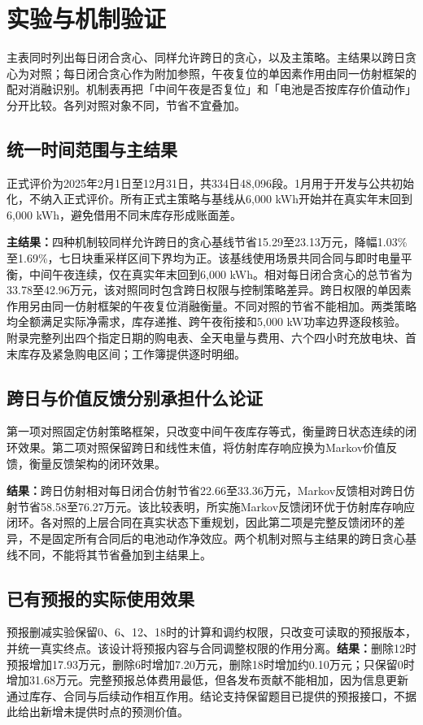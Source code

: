 \documentclass[UTF8,a4paper,zihao=-4,fontset=mac]{ctexart}
\begin{document}
\section{实验与机制验证}
主表同时列出每日闭合贪心、同样允许跨日的贪心，以及主策略。主结果以跨日贪心为对照；每日闭合贪心作为附加参照，午夜复位的单因素作用由同一仿射框架的配对消融识别。机制表再把「中间午夜是否复位」和「电池是否按库存价值动作」分开比较。各列对照对象不同，节省不宜叠加。

\subsection{统一时间范围与主结果}
正式评价为2025年2月1日至12月31日，共334日48,096段。1月用于开发与公共初始化，不纳入正式评价。所有正式主策略与基线从6,000 kWh开始并在真实年末回到6,000 kWh，避免借用不同末库存形成账面差。


\textbf{主结果：}四种机制较同样允许跨日的贪心基线节省15.29至23.13万元，降幅1.03\%至1.69\%，七日块重采样区间下界均为正。该基线使用场景共同合同与即时电量平衡，中间午夜连续，仅在真实年末回到6,000 kWh。相对每日闭合贪心的总节省为33.78至42.96万元，该对照同时包含跨日权限与控制策略差异。跨日权限的单因素作用另由同一仿射框架的午夜复位消融衡量。不同对照的节省不能相加。两类策略均全额满足实际净需求，库存递推、跨午夜衔接和5,000 kW功率边界逐段核验。附录完整列出四个指定日期的购电表、全天电量与费用、六个四小时充放电块、首末库存及紧急购电区间；工作簿提供逐时明细。

\subsection{跨日与价值反馈分别承担什么论证}
第一项对照固定仿射策略框架，只改变中间午夜库存等式，衡量跨日状态连续的闭环效果。第二项对照保留跨日和线性末值，将仿射库存响应换为Markov价值反馈，衡量反馈架构的闭环效果。

\textbf{结果：}跨日仿射相对每日闭合仿射节省22.66至33.36万元，Markov反馈相对跨日仿射节省58.58至76.27万元。该比较表明，所实施Markov反馈闭环优于仿射库存响应闭环。各对照的上层合同在真实状态下重规划，因此第二项是完整反馈闭环的差异，不是固定所有合同后的电池动作净效应。两个机制对照与主结果的跨日贪心基线不同，不能将其节省叠加到主结果上。

\subsection{已有预报的实际使用效果}

预报删减实验保留0、6、12、18时的计算和调约权限，只改变可读取的预报版本，并统一真实终点。该设计将预报内容与合同调整权限的作用分离。\textbf{结果：}删除12时预报增加17.93万元，删除6时增加7.20万元，删除18时增加约0.10万元；只保留0时增加31.68万元。完整预报总体费用最低，但各发布贡献不能相加，因为信息更新通过库存、合同与后续动作相互作用。结论支持保留题目已提供的预报接口，不据此给出新增未提供时点的预测价值。
\end{document}
